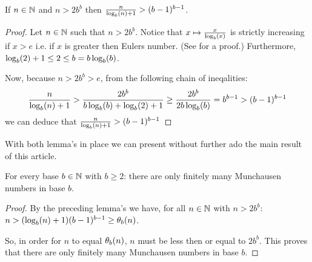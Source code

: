 \begin{lemma}
	If $n \in \N$ and $n > 2b^{b}$ then $\frac{n}{\blog(n) + 1}	> (b-1)^{b-1}$.
\end{lemma}

\begin{proof}
	Let $n \in \N$ such that $n > 2b^{b}$. Notice that 
	$x \mapsto \frac{x}{\blog(x)}$ is strictly increasing if $x > e$ i.e. if $x$
	is greater then Eulers number. (See \cite{tao} for a proof.) Furthermore, 
	$\blog(2) + 1 \le 2 \le b = b\blog(b)$. 
	
	Now, because $n > 2b^{b} > e$, from the following chain of ineqalities:
	\[
		\frac{n}{\blog(n) + 1} > \frac{2b^{b}}{b\blog(b) + \blog(2) + 1} \ge 
		\frac{2b^{b}}{2b\blog(b)} = b^{b-1} > (b-1)^{b-1}
	\]
	we can deduce that $\frac{n}{\blog(n) + 1} > (b-1)^{b-1}$
\end{proof}

With both lemma's in place we can present without further ado the main result of
this article.

\begin{proposition}
	For every base $b \in \N$ with $b \ge 2$: there are only finitely many 
	Munchausen numbers in base $b$.
\end{proposition}

\begin{proof}
	By the preceding lemma's we have, for all $n \in \N$ with $n > 2b^{b}$: 
	$n > (\blog(n) + 1)(b-1)^{b-1} \ge \P_{b}(n)$.
	
	So, in order for $n$ to equal $\P_{b}(n)$, $n$ must be less then or equal to 
	$2b^{b}$. This proves that there are only finitely many Munchausen numbers
	in base $b$.
\end{proof}
